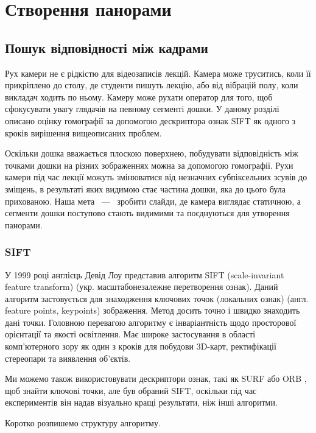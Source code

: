 \section{Створення панорами}
\vspace{-\baselineskip}
\subsection{Пошук відповідності між кадрами}

Рух камери не є рідкістю для відеозаписів лекцій. Камера може труситись,
коли її прикріплено до столу, де студенти пишуть лекцію, або від
вібрацій полу, коли викладач ходить по ньому. Камеру може рухати
оператор для того, щоб сфокусувати увагу глядачів на певному сегменті
дошки. У даному розділі описано оцінку гомографії за допомогою
дескриптора ознак SIFT як одного з кроків вирішення вищеописаних
проблем.

Оскільки дошка вважається плоскою поверхнею, побудувати відповідність
між точками дошки на різних зображеннях можна за допомогою гомографії.
Рухи камери під час лекції можуть змінюватися від незначних
субпіксельних зсувів до зміщень, в результаті яких видимою стає частина
дошки, яка до цього була прихованою. Наша мета ~---~ зробити слайди, де
камера виглядає статичною, а сегменти дошки поступово стають видимими та
поєднуються для утворення панорами.

\subsubsection{SIFT}

У 1999 році англієць Девід Лоу представив алгоритм SIFT (scale-invariant feature transform)
\cite{bib:sift} (укр. масштабонезалежне перетворення ознак). Даний алгоритм
застовується для знаходження ключових точок (локальних ознак) (англ. feature points, keypoints) зображення.
Метод досить точно і швидко знаходить дані точки.
Головною перевагою алгоритму є інваріантність щодо просторової орієнтації та якості освітлення.
Має широке застосування в області комп'ютерного зору як один з кроків для побудови 3D-карт,
ректифікації стереопари та виявлення об'єктів.

Ми можемо також використовувати дескриптори ознак, такі як SURF \cite{bib:surf} або ORB \cite{bib:orb},
щоб знайти ключові точки, але був обраний SIFT,
оскільки під час експериментів він надав візуально кращі результати, ніж
інші алгоритми.

Коротко розпишемо структуру алгоритму.

